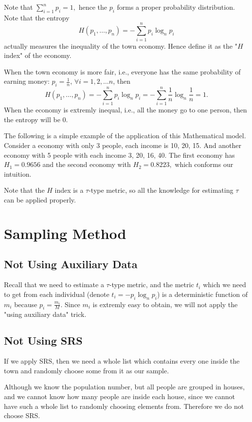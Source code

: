 \documentclass[12pt]{article}%
\begin{document}
Note that $\sum_{i=1}^{n}p_i=1,$ hence the $p_i$ forms a proper probability distribution. Note that the entropy $$H(p_1,\dots,p_n)=-\sum_{i=1}^{n}p_i\log_{n}{p_i}$$ actually measures the 
inequality of the town economy. Hence define it as the "$H$ index" of the economy.

When the town economy is more fair, i.e., everyone has the same probability of earning money: $p_i=\frac{1}{n}$, $\forall i=1,2,\dots n$, then $$H(p_1,\dots, p_n)=-\sum_{i=1}^{n}p_i\log_{n}{p_i}=-\sum_{i=1}^{n}\frac{1}{n}\log_{n}{\frac{1}{n}}=1.$$ 
When the economy is extremly inequal, i.e., all the money go to one person, then the entropy will be 0.

The following is a simple example of the application of this Mathematical model. Consider a economy with only 3 people, each income is 10, 20, 15. 
And another economy with 5 people with each income  3, 20, 16, 40. The first economy has $H_1=0.9656$ and the second economy with $H_2=0.8223,$ which conforms our intuition.


Note that the $H$ index is a $\tau$-type metric, so all the knowledge for estimating $\tau$ can be applied properly.


\section{Sampling Method}

\subsection{Not Using Auxiliary Data}
Recall that we need to estimate a $\tau$-type metric, and the metric $t_i$ which we need to get from each individual (denote $t_i=-p_i\log_{n}{p_i}$) is a deterministic function of $m_i$ because $p_i=\frac{m_i}{M}$.
Since $m_i$ is extremly easy to obtain, we will not apply the "using auxiliary data" trick.

\subsection{Not Using SRS}
If we apply SRS, then we need a whole list which contains every one inside the town and randomly choose some from it as our sample.

Although we know the population number, but all people are grouped in houses, and we cannot know how many people are inside each house,
since we cannot have such a whole list to randomly choosing elements from. Therefore we do not choose SRS.
\end{document}
